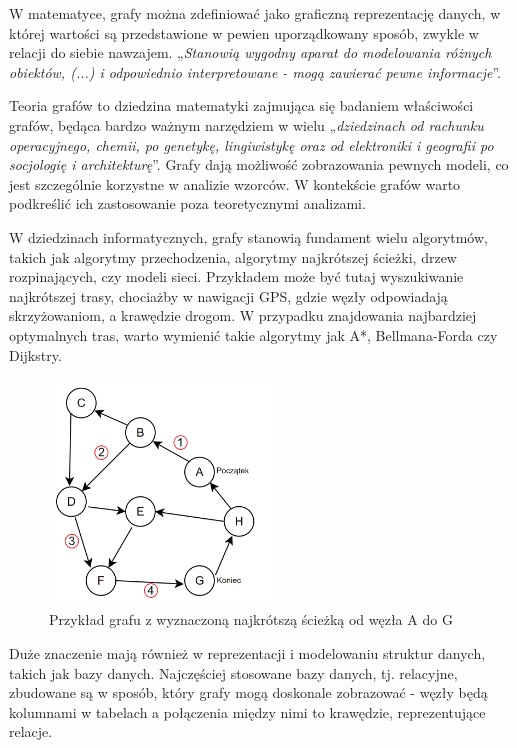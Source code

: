 W matematyce, grafy można zdefiniować jako graficzną reprezentację danych,
w której wartości są przedstawione w pewien uporządkowany sposób, zwykle w relacji do siebie nawzajem.
„\textit{Stanowią wygodny aparat do modelowania różnych obiektów, (...) i odpowiednio interpretowane
- mogą zawierać pewne informacje}”\cite{Wloch2008}.

Teoria grafów to dziedzina matematyki zajmująca się badaniem właściwości grafów,
będąca bardzo ważnym narzędziem w wielu „\textit{dziedzinach od rachunku operacyjnego, chemii, po genetykę, lingiwistykę
oraz od elektroniki i geografii po socjologię i architekturę}”\cite{Wilson2012}.
Grafy dają możliwość zobrazowania pewnych modeli, co jest szczególnie korzystne w analizie wzorców.
W kontekście grafów warto podkreślić ich zastosowanie poza teoretycznymi analizami.

W dziedzinach informatycznych, grafy stanowią fundament wielu algorytmów, takich jak algorytmy przechodzenia,
algorytmy najkrótszej ścieżki, drzew rozpinających, czy modeli sieci.
Przykładem może być tutaj wyszukiwanie najkrótszej trasy, chociażby w nawigacji GPS,
gdzie węzły odpowiadają skrzyżowaniom, a krawędzie drogom.
W przypadku znajdowania najbardziej optymalnych tras, warto wymienić takie algorytmy jak A*, Bellmana-Forda czy Dijkstry.

\begin{figure}[ht]
	\centering
	\includegraphics[height=6cm]{partials/images/intro_shortest_path.png}
	\caption{Przykład grafu z wyznaczoną najkrótszą ścieżką od węzła A do G}
    \label{Fig:intro-1}
\end{figure}

Duże znaczenie mają również w reprezentacji i modelowaniu struktur danych, takich jak bazy danych.
Najczęściej stosowane bazy danych, tj. relacyjne, zbudowane są w sposób, który grafy mogą doskonale zobrazować -
węzły będą kolumnami w tabelach a połączenia między nimi to krawędzie, reprezentujące relacje.

